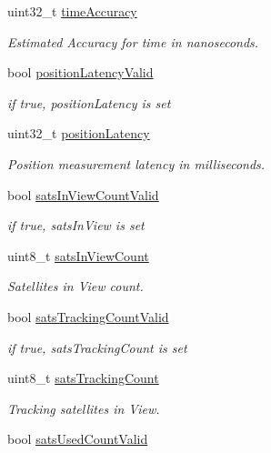 \begin{DoxyCompactItemize}
uint32\+\_\+t \hyperlink{structpa___gnss___position__t_ad142b2e6733d0b0df6683b38dda4911e}{time\+Accuracy}
\begin{DoxyCompactList}\small\item\em Estimated Accuracy for time in nanoseconds. \end{DoxyCompactList}\item 
bool \hyperlink{structpa___gnss___position__t_a74a7abe0ccd0b4ef8cadc0907b9afeba}{position\+Latency\+Valid}
\begin{DoxyCompactList}\small\item\em if true, position\+Latency is set \end{DoxyCompactList}\item 
uint32\+\_\+t \hyperlink{structpa___gnss___position__t_a2160a82427b81ea95e5427eb6ff302ee}{position\+Latency}
\begin{DoxyCompactList}\small\item\em Position measurement latency in milliseconds. \end{DoxyCompactList}\item 
bool \hyperlink{structpa___gnss___position__t_a28caf627c377231b98dad35d6277e03a}{sats\+In\+View\+Count\+Valid}
\begin{DoxyCompactList}\small\item\em if true, sats\+In\+View is set \end{DoxyCompactList}\item 
uint8\+\_\+t \hyperlink{structpa___gnss___position__t_ae78a18b672129442eb309aec67faf1fa}{sats\+In\+View\+Count}
\begin{DoxyCompactList}\small\item\em Satellites in View count. \end{DoxyCompactList}\item 
bool \hyperlink{structpa___gnss___position__t_a45facf50720ffea4d20ecb8568a28e74}{sats\+Tracking\+Count\+Valid}
\begin{DoxyCompactList}\small\item\em if true, sats\+Tracking\+Count is set \end{DoxyCompactList}\item 
uint8\+\_\+t \hyperlink{structpa___gnss___position__t_ab882bbea2e635ce5f3bda14a946d65ac}{sats\+Tracking\+Count}
\begin{DoxyCompactList}\small\item\em Tracking satellites in View. \end{DoxyCompactList}\item 
bool \hyperlink{structpa___gnss___position__t_aaa1c82db41aee5d1ea1751676c64cab7}{sats\+Used\+Count\+Valid}

\end{DoxyCompactItemize}
